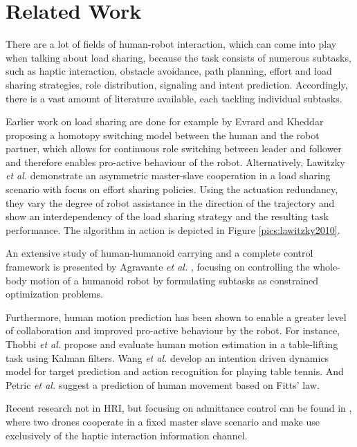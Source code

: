 \chapter{Related Work}
There are a lot of fields of human-robot interaction, which can come into play when talking about load sharing, because the task consists of numerous subtasks, such as haptic interaction, obstacle avoidance, path planning, effort and load sharing strategies, role distribution, signaling and intent prediction. Accordingly, there is a vast amount of literature available, each tackling individual subtasks.

Earlier work on load sharing are done for example by Evrard and Kheddar \citep{evrard2009homotopy} proposing a homotopy switching model between the human and the robot partner, which allows for continuous role switching between leader and follower and therefore enables pro-active behaviour of the robot. Alternatively, Lawitzky \textit{et al.} \citep{lawitzky2010load} demonstrate an asymmetric master-slave cooperation in a load sharing scenario with focus on effort sharing policies. Using the actuation redundancy, they vary the degree of robot assistance in the direction of the trajectory and show an interdependency of the load sharing strategy and the resulting task performance. The algorithm in action is depicted in Figure \ref{pics:lawitzky2010}.

An extensive study of human-humanoid carrying and a complete control framework is presented by Agravante \textit{et al.} \citep{agravante2016human}, focusing on controlling the whole-body motion of a humanoid robot by formulating subtasks as constrained optimization problems.

Furthermore, human motion prediction has been shown to enable a greater level of collaboration and improved pro-active behaviour by the robot. For instance, Thobbi \textit{et al.} \citep{thobbi2011using} propose and evaluate human motion estimation in a table-lifting task using Kalman filters. Wang \textit{et al.} \citep{wang2013probabilistic} develop an intention driven dynamics model for target prediction and action recognition for playing table tennis. And Petric \textit{et al.} \citep{petrivc2016cooperative} suggest a prediction of human movement based on Fitts' law.

Recent research not in HRI, but focusing on admittance control can be found in \citep{tagliabue2017collaborative}, where two drones cooperate in a fixed master slave scenario and make use exclusively of the haptic interaction information channel.


